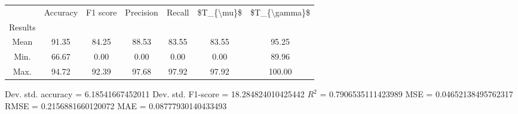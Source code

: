\begin{tabular}{|c|c|c|c|c|c|c|}
\toprule
{} &  Accuracy &  F1 score &  Precision &  Recall &  \$T\_\{\textbackslash mu\}\$ &  \$T\_\{\textbackslash gamma\}\$ \\
Results &           &           &            &         &            &               \\
\hline
Mean    &     91.35 &     84.25 &      88.53 &   83.55 &      83.55 &         95.25 \\
Min.    &     66.67 &      0.00 &       0.00 &    0.00 &       0.00 &         89.96 \\
Max.    &     94.72 &     92.39 &      97.68 &   97.92 &      97.92 &        100.00 \\
\bottomrule
\end{tabular}

 Dev. std. accuracy = 6.18541667452011
 Dev. std. F1-score = 18.284824010425442
 $R^2$ = 0.7906535111423989
 MSE = 0.04652138495762317
 RMSE = 0.2156881660120072
 MAE = 0.08777930140433493
